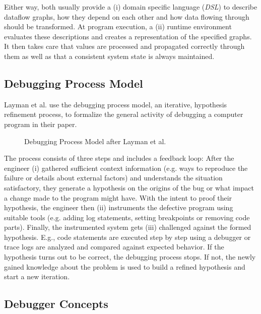 \documentclass[12pt,a4paper]{article}
\begin{document}
Either way, both usually provide a (i) domain specific language (\emph{DSL}) to describe dataflow graphs, how they depend on each other and how data flowing through should be transformed. At program execution, a (ii) runtime environment evaluates these descriptions and creates a representation of the specified graphs. It then takes care that values are processed and propagated correctly through them as well as that a consistent system state\cite{10.1145/2501654.2501666} is always maintained.

\subsection{Debugging Process Model}

Layman et al. \cite{Layman_Diep_Nagappan_Singer_Deline_Venolia_2013} use the debugging process model, an iterative, hypothesis refinement process, to formalize the general activity of debugging a computer program in their paper.

\begin{figure}[H]
	\centering
	\caption{Debugging Process Model after Layman et al. \cite{Layman_Diep_Nagappan_Singer_Deline_Venolia_2013}}
	\label{fig:debugging-process-model}
\end{figure}

The process consists of three steps and includes a feedback loop: After the engineer (i) gathered sufficient context information (e.g. ways to reproduce the failure or details about external factors) and understands the situation satisfactory, they generate a hypothesis on the origins of the bug or what impact a change made to the program might have. With the intent to proof their hypothesis, the engineer then (ii) instruments the defective program using suitable tools (e.g. adding log statements, setting breakpoints or removing code parts). Finally, the instrumented system gets (iii) challenged against the formed hypothesis. E.g., code statements are executed step by step using a debugger or trace logs are analyzed and compared against expected behavior. If the hypothesis turns out to be correct, the debugging process stops. If not, the newly gained knowledge about the problem is used to build a refined hypothesis and start a new iteration.

\subsection{Debugger Concepts}
\end{document}
